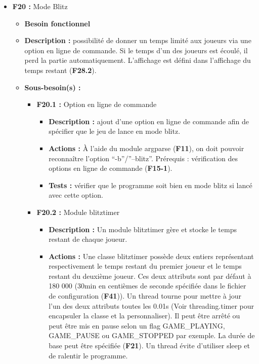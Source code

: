 \documentclass{article}
\begin{document}
\medskip
\begin{itemize}
    \item \textbf{F20 :} Mode Blitz
    \begin{itemize}
        \item \textbf{Besoin fonctionnel}
        \item \textbf{Description :} possibilité de donner un temps limité aux joueurs via une option en ligne de commande. Si le temps d’un des joueurs est écoulé, il perd la partie automatiquement. L’affichage est défini dans l'affichage du temps restant (\textbf{F28.2}).
        \item \textbf{Sous-besoin(s) :}
        \begin{itemize}
            \smallskip
            \item \textbf{F20.1 :} Option en ligne de commande
            \begin{itemize}
                \item \textbf{Description :} ajout d’une option en ligne de commande afin de spécifier que le jeu de lance en mode blitz.
                \item \textbf{Actions :} À l’aide du module argparse (\textbf{F11}), on doit pouvoir reconnaître l’option “-b”/”--blitz”.
                Prérequis : vérification des options en ligne de commande (\textbf{F15-1}).
                \item \textbf{Tests :} vérifier que le programme soit bien en mode blitz si lancé avec cette option.
            \end{itemize}
            \smallskip
            \item \textbf{F20.2 :} Module blitztimer
            \begin{itemize}
                \item \textbf{Description :} Un module blitztimer gère et stocke le temps restant de chaque joueur.
                \item \textbf{Actions :} Une classe blitztimer possède deux entiers représentant respectivement le temps restant du premier joueur et le temps restant du deuxième joueur. Ces deux attributs sont par défaut à 180 000 (30min en centièmes de seconde spécifiée dans le fichier de configuration (\textbf{F41})). Un thread tourne pour mettre à jour l’un des deux attributs toutes les 0.01s (Voir threading.timer pour encapsuler la classe et la personnaliser). Il peut être arrêté ou peut être mis en pause selon un flag GAME\_PLAYING, GAME\_PAUSE ou GAME\_STOPPED par exemple. La durée de base peut être spécifiée (\textbf{F21}). Un thread évite d’utiliser sleep et de ralentir le programme.

\end{itemize}
\end{itemize}
\end{itemize}
\end{itemize}
\end{document}

